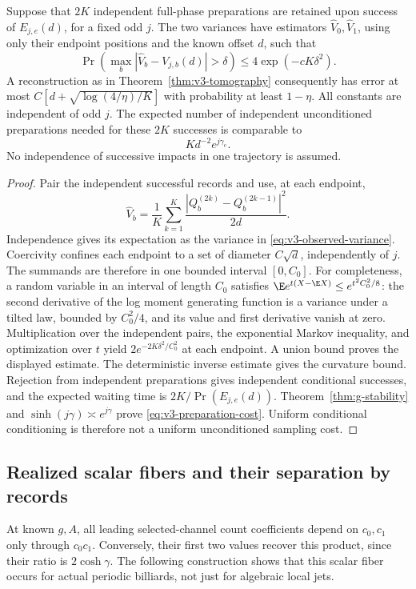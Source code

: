 \begin{proposition}\label{prop:v3-sampling}
Suppose that $2K$ independent full-phase preparations are retained upon
success of $E_{j,e}(d)$, for a fixed odd $j$. The two variances have
estimators $\widehat V_0,\widehat V_1$, using only their endpoint
positions and the known offset $d$, such that
\[
 \Pr\left(\max_b|\widehat V_b-V_{j,b}(d)|>\delta\right)
                \le4\exp(-cK\delta^2).
\]
A reconstruction as in Theorem~\ref{thm:v3-tomography} consequently
has error at most $C[d+\sqrt{\log(4/\eta)/K}]$ with probability
at least $1-\eta$. All constants are independent of odd $j$.
The expected number of independent unconditioned preparations needed
for these $2K$ successes is comparable to
\begin{equation}\label{eq:v3-preparation-cost}
                  Kd^{-2}e^{j\gamma_e}.
\end{equation}
No independence of successive impacts in one trajectory is assumed.
\end{proposition}
\begin{proof}
Pair the independent successful records and use, at each endpoint,
\[
 \widehat V_b=\frac1K\sum_{k=1}^K
       \frac{|Q_b^{(2k)}-Q_b^{(2k-1)}|^2}{2d}.
\]
Independence gives its expectation as the variance in
\eqref{eq:v3-observed-variance}. Coercivity confines each endpoint
to a set of diameter $C\sqrt d$, independently of $j$. The summands
are therefore in one bounded interval $[0,C_0]$. For completeness,
a random variable in an interval of length $C_0$ satisfies
$\E e^{t(X-\E X)}\le e^{t^2C_0^2/8}$: the second derivative of
the log moment generating function is a variance under a tilted law,
bounded by $C_0^2/4$, and its value and first derivative vanish at zero.
Multiplication over the independent pairs, the exponential Markov
inequality, and optimization over $t$ yield
$2e^{-2K\delta^2/C_0^2}$ at each endpoint. A union bound proves
the displayed estimate. The deterministic inverse estimate gives the
curvature bound. Rejection from independent preparations gives
independent conditional successes, and the expected waiting time is
$2K/\Pr(E_{j,e}(d))$. Theorem~\ref{thm:g-stability} and
$\sinh(j\gamma)\asymp e^{j\gamma}$ prove
\eqref{eq:v3-preparation-cost}. Uniform conditional conditioning is
therefore not a uniform unconditioned sampling cost.
\end{proof}

\subsection{Realized scalar fibers and their separation by records}
At known $g,A$, all leading selected-channel count coefficients depend
on $c_0,c_1$ only through $c_0c_1$. Conversely, their first two values
recover this product, since their ratio is $2\cosh\gamma$. The
following construction shows that this scalar fiber occurs for actual
periodic billiards, not just for algebraic local jets.


